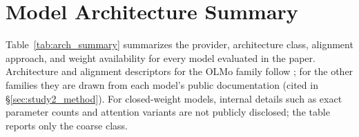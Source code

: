 \documentclass[11pt]{article}
\begin{document}
\FloatBarrier

\section{Model Architecture Summary}
\label{app:architectures}

Table~\ref{tab:arch_summary} summarizes the provider, architecture class, alignment approach, and weight availability for every model evaluated in the paper. Architecture and alignment descriptors for the OLMo family follow \citet{olmo3}; for the other families they are drawn from each model's public documentation (cited in \S\ref{sec:study2_method}). For closed-weight models, internal details such as exact parameter counts and attention variants are not publicly disclosed; the table reports only the coarse class.
\end{document}
